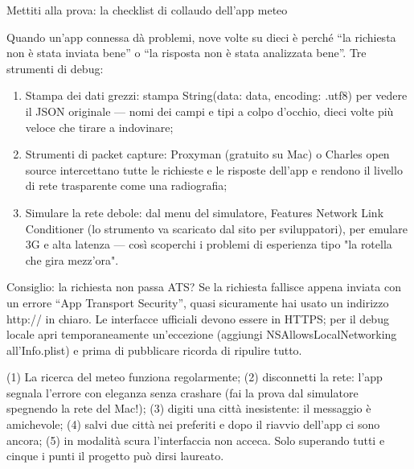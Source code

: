 \begin{tcbpractice}{Mettiti alla prova: la checklist di collaudo dell'app meteo}

Quando un'app connessa dà problemi, nove volte su dieci è perché “la richiesta non è stata inviata bene” o “la risposta non è stata analizzata bene”. Tre strumenti di debug:

\begin{enumerate}
  \item Stampa dei dati grezzi: stampa String(data: data, encoding: .utf8) per vedere il JSON originale — nomi dei campi e tipi a colpo d'occhio, dieci volte più veloce che tirare a indovinare;
  \item Strumenti di packet capture: Proxyman (gratuito su Mac) o Charles open source intercettano tutte le richieste e le risposte dell'app e rendono il livello di rete trasparente come una radiografia;
  \item Simulare la rete debole: dal menu del simulatore, Features Network Link Conditioner (lo strumento va scaricato dal sito per sviluppatori), per emulare 3G e alta latenza — così scoperchi i problemi di esperienza tipo "la rotella che gira mezz'ora".
\end{enumerate}

\begin{tcbinfo}{Consiglio: la richiesta non passa ATS?}
Se la richiesta fallisce appena inviata con un errore “App Transport Security”, quasi sicuramente hai usato un indirizzo http:// in chiaro. Le interfacce ufficiali devono essere in HTTPS; per il debug locale apri temporaneamente un'eccezione (aggiungi NSAllowsLocalNetworking all'Info.plist) e prima di pubblicare ricorda di ripulire tutto.

\end{tcbinfo}

(1) La ricerca del meteo funziona regolarmente; (2) disconnetti la rete: l'app segnala l'errore con eleganza senza crashare (fai la prova dal simulatore spegnendo la rete del Mac!); (3) digiti una città inesistente: il messaggio è amichevole; (4) salvi due città nei preferiti e dopo il riavvio dell'app ci sono ancora; (5) in modalità scura l'interfaccia non acceca. Solo superando tutti e cinque i punti il progetto può dirsi laureato.

\end{tcbpractice}

